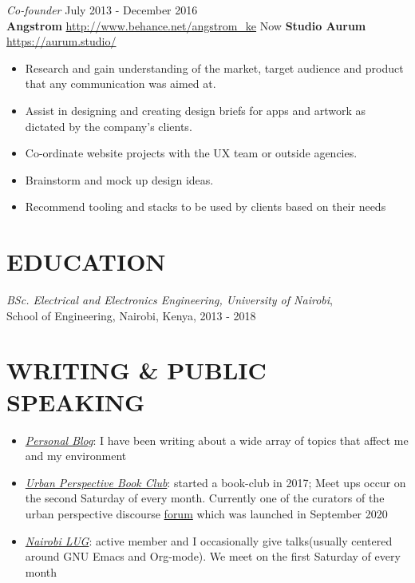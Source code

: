 \documentclass[margin, line]{res} %
\begin{document}
    {\sl Co-founder} \hfill July 2013 - December 2016\\
    \textbf{Angstrom} \hfill \url{http://www.behance.net/angstrom_ke}
    Now \textbf{Studio Aurum} \hfill \url{https://aurum.studio/}
    \begin{itemize} \itemsep -2pt %
    \item Research and gain understanding of the market, target
      audience and product that any communication was aimed at.
    \item Assist in designing and creating design briefs for apps and
      artwork as dictated by the company's clients.
    \item Co-ordinate website projects with the UX team or outside
      agencies.
    \item Brainstorm and mock up design ideas.
    \item Recommend tooling and stacks to be used by clients based on
      their needs
    \end{itemize}

    \section{EDUCATION}

    {\sl BSc. Electrical and Electronics Engineering, University of Nairobi},\\ School of Engineering, Nairobi, Kenya, 2013 - 2018


    \section{WRITING \& PUBLIC SPEAKING}

    \begin{itemize}
    \item \href{https://bonfacemunyoki.com}{\textit{Personal Blog}}:  I have been writing about a wide array of topics that affect me and my environment
    \item \href{https://upbookclub.com/}{\textit{Urban Perspective Book Club}}: started a book-club in 2017; Meet ups occur on the second Saturday of every month. Currently one of the curators of the urban perspective discourse \href{https://upbookclub.com}{forum} which was launched in September 2020
    \item \href{https://nairobilug.or.ke/}{\textit{Nairobi LUG}}: active member and I occasionally give talks(usually centered around GNU Emacs and Org-mode). We meet on the first Saturday of every month
    \end{itemize}

\end{document}
